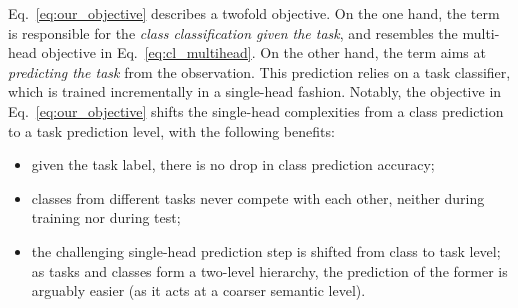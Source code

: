 \documentclass[10pt,twocolumn,letterpaper]{article}
\begin{document}
Eq.~\ref{eq:our_objective} describes a twofold objective. 
On the one hand, the term  is responsible for the \textit{class classification given the task}, and resembles the multi-head objective in Eq.~\ref{eq:cl_multihead}. 
On the other hand, the term  aims at \textit{predicting the task} from the observation. This prediction relies on a task classifier, which is trained incrementally in a single-head fashion. 
Notably, the objective in Eq.~\ref{eq:our_objective} shifts the single-head complexities from a class prediction to a task prediction level, with the following benefits:
\begin{itemize}[noitemsep]
    \item given the task label, there is no drop in class prediction accuracy;
    \item classes from different tasks never compete with each other, neither during training nor during test;
    \item the challenging single-head prediction step is shifted from class to task level; as tasks and classes form a two-level hierarchy, the prediction of the former is arguably easier (as it acts at a coarser semantic level).
\end{itemize}
\end{document}
